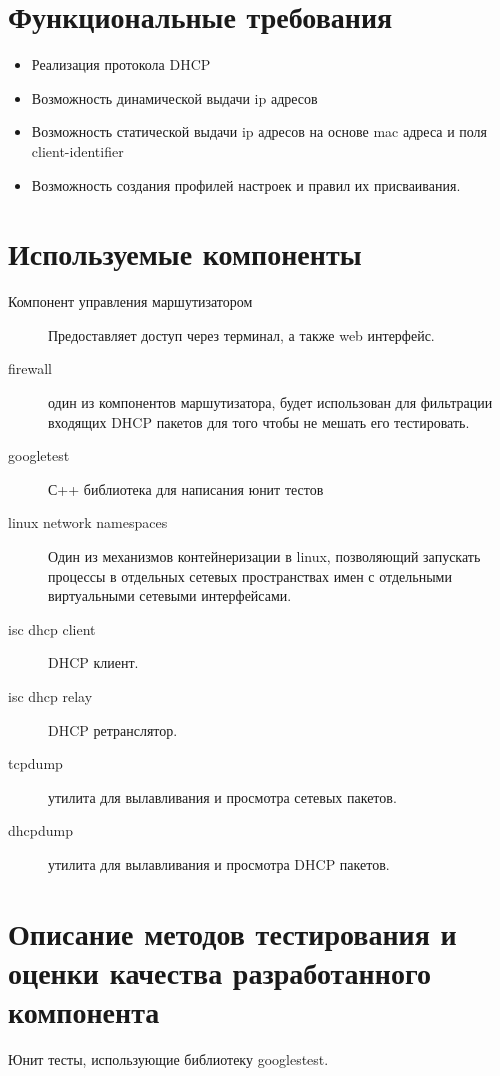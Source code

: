 \documentclass[12pt]{article}
\begin{document}
\section{Функциональные требования}
\begin{itemize}
    \item Реализация протокола DHCP
    \item Возможность динамической выдачи ip адресов
    \item Возможность статической выдачи ip адресов на основе mac адреса и поля client-identifier
    \item Возможность создания профилей настроек и правил их присваивания.
\end{itemize}
    
\section{Используемые компоненты}
\begin{description}
    \item[Компонент управления маршутизатором] Предоставляет доступ через терминал, а также web интерфейс.
    \item[firewall] один из компонентов маршутизатора, будет использован для фильтрации входящих DHCP пакетов для того чтобы не мешать его тестировать.
    \item[googletest] С++ библиотека для написания юнит тестов
    \item[linux network namespaces] Один из механизмов контейнеризации в linux, позволяющий запускать процессы в отдельных сетевых пространствах имен с отдельными виртуальными сетевыми интерфейсами.
    \item[isc dhcp client] DHCP клиент.
    \item[isc dhcp relay] DHCP ретранслятор.
    \item[ tcpdump] утилита для вылавливания и просмотра сетевых пакетов.
    \item[dhcpdump] утилита для вылавливания и просмотра DHCP пакетов.
\end{description}

\section{Описание методов тестирования и оценки качества разработанного компонента}
Юнит тесты, использующие библиотеку googlestest.
\end{document}
